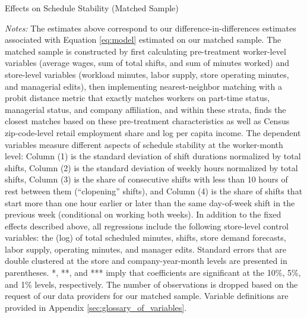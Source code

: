 \documentclass[letterpaper,11pt,leqno]{article}
\theoremstyle{paper}
\newcommand{\note}[2][]{\parbox{\textwidth}{\footnotesize\vspace*{10pt}\textit{#1}#2}}
\begin{document}
\pagebreak 
\begin{singlespace}
\begin{table}[H]
\caption{Effects on Schedule Stability (Matched Sample)}

\note{\textit{Notes: } \scriptsize The estimates above correspond to our difference-in-differences estimates associated with Equation \ref{eq:model} estimated on our matched sample. The matched sample is constructed by first calculating pre-treatment worker-level variables (average wages, sum of total shifts, and sum of minutes worked) and store-level variables (workload minutes, labor supply, store operating minutes, and managerial edits), then implementing nearest-neighbor matching with a probit distance metric that exactly matches workers on part-time status, managerial status, and company affiliation, and within these strata, finds the closest matches based on these pre-treatment characteristics as well as Census zip-code-level retail employment share and log per capita income. The dependent variables measure different aspects of schedule stability at the worker-month level: Column (1) is the standard deviation of shift durations normalized by total shifts, Column (2) is the standard deviation of weekly hours normalized by total shifts, Column (3) is the share of consecutive shifts with less than 10 hours of rest between them (``clopening'' shifts), and Column (4) is the share of shifts that start more than one hour earlier or later than the same day-of-week shift in the previous week (conditional on working both weeks).  In addition to the fixed effects described above, all regressions include the following store-level control variables: the (log) of total scheduled minutes, shifts, store demand forecasts, labor supply, operating minutes, and manager edits. Standard errors that are double clustered at the store and company-year-month levels are presented in parentheses. *, **, and *** imply that coefficients are significant at the 10\%, 5\%, and 1\% levels, respectively. The number of observations is dropped based on the request of our data providers for our matched sample. Variable definitions are provided in Appendix \ref{sec:glossary_of_variables}.}
\label{table:stab_regs_matched}
\end{table}
\end{singlespace}
\end{document}

